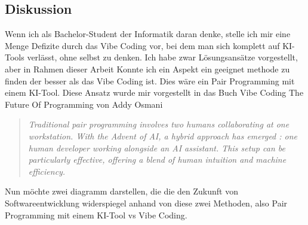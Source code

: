 \documentclass[paper=a4,fontsize=12pt,ngerman]{scrartcl}
\begin{document}
\subsection{Diskussion}
Wenn ich als Bachelor-Student der Informatik daran denke, stelle ich mir eine Menge Defizite durch das Vibe Coding vor, bei dem man sich komplett auf KI-Tools verlässt, ohne selbst zu denken.
Ich habe zwar Lösungsansätze vorgestellt, aber in Rahmen dieser Arbeit Konnte ich ein Aspekt ein geeignet methode zu finden der besser als das 
Vibe Coding ist. Dies wäre ein Pair Programming mit einem KI-Tool. Diese Ansatz wurde mir vorgestellt in das Buch 
Vibe Coding The Future Of Programming von Addy Osmani 
\begin{quote}
\textit{Traditional pair programming involves two humans collaborating at one workstation. With the Advent of AI, a hybrid approach has 
emerged : one human developer working alongside an AI assistant. This setup can be particularly effective, offering a blend of human intuition and machine efficiency.}
\end{quote}
\citep{Vibe_Coding_The_Future_Of_Programming2}
Nun möchte zwei diagramm darstellen, die die den Zukunft von Softwareentwicklung widerspiegel anhand von diese zwei Methoden, also 
Pair Programming mit einem KI-Tool vs Vibe Coding.
\end{document}
